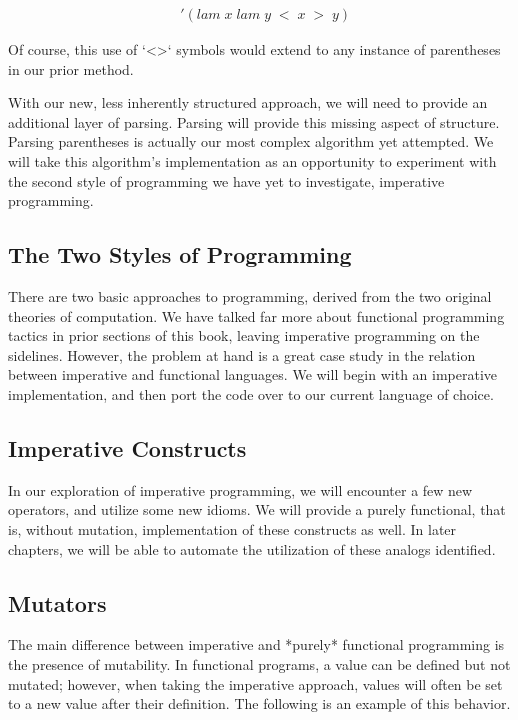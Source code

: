\begin{align*}
& '(lam \; x \; lam \; y \; < \; x \; > \; y)
\end{align*}

Of course, this use of `<>` symbols would extend to any instance of parentheses 
in our prior method.

With our new, less inherently structured approach, we will need to provide an 
additional layer of parsing. Parsing will provide this missing aspect of structure. 
Parsing parentheses is actually our most complex algorithm yet attempted. We will 
take this algorithm's implementation as an opportunity to experiment with the 
second style of programming we have yet to investigate, imperative programming.

\subsection{The Two Styles of Programming}
There are two basic approaches to programming, derived from the two original 
theories of computation. We have talked far more about functional programming 
tactics in prior sections of this book, leaving imperative programming on the 
sidelines. However, the problem at hand is a great case study in the relation 
between imperative and functional languages. We will begin with an imperative 
implementation, and then port the code over to our current language of choice.

\subsection{Imperative Constructs}
In our exploration of imperative programming, we will encounter a few new operators, 
and utilize some new idioms. We will provide a purely functional, that is, without
mutation, implementation of these constructs as well. In later chapters, we will be
able to automate the utilization of these analogs identified.

\subsection{Mutators}
The main difference between imperative and *purely* functional programming is the 
presence of mutability. In functional programs, a value can be defined but not 
mutated; however, when taking the imperative approach, values will often be set to 
a new value after their definition. The following is an example of this behavior.

